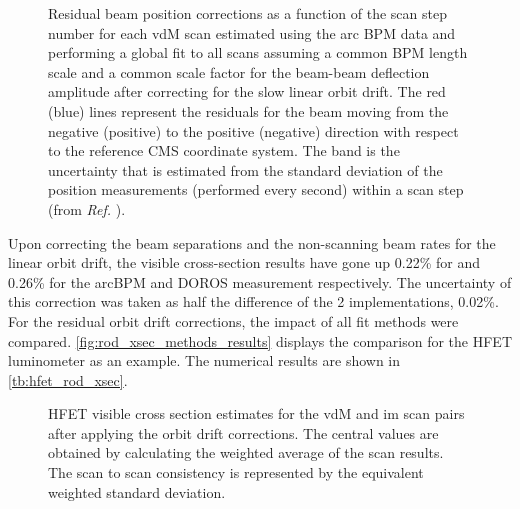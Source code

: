 \begin{itemize}
	\begin{figure}[!htb]
		\centering
		\caption{Residual beam position corrections as a function of the scan step number for each vdM scan estimated using the arc BPM data and performing a global fit to all scans assuming a common BPM length scale and a common scale factor for the beam-beam deflection amplitude after correcting for the slow linear orbit drift. The red (blue) lines represent the residuals for the beam moving from the negative (positive) to the positive (negative) direction with respect to the reference CMS coordinate system. The band is the uncertainty that is estimated from the standard deviation of the position measurements (performed every second) within a scan step (from \textit{Ref.} \cite{CMS-DP-2024-068}).}
		\label{fig:dps_residual_orbit_drifts}
	\end{figure}
\end{itemize}

Upon correcting the beam separations and the non-scanning beam rates for the linear orbit drift, the visible cross-section results have gone up 0.22\% for and 0.26\% for the arcBPM and DOROS measurement respectively. The uncertainty of this correction was taken as half the difference of the 2 implementations, 0.02\%. For the residual orbit drift corrections, the impact of all fit methods were compared. \autoref{fig:rod_xsec_methods_results} displays the comparison for the HFET luminometer as an example. The numerical results are shown in \autoref{tb:hfet_rod_xsec}.

\begin{figure}[!htb]
	\centering
	\caption{HFET visible cross section estimates for the vdM and im scan pairs after applying the orbit drift corrections. The central values are obtained by calculating the weighted average of the scan results. The scan to scan consistency is represented by the equivalent weighted standard deviation.}
	\label{fig:rod_xsec_methods_results}
\end{figure}


